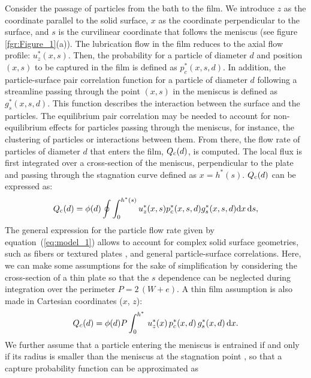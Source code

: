 \documentclass{jfm}
\begin{document}
Consider the passage of particles from the bath to the film. We introduce $z$ as the coordinate parallel to the solid surface, $x$ as the coordinate perpendicular to the surface, and $s$ is the curvilinear coordinate that follows the meniscus (see figure \ref{fgr:Figure_1}(a)). The lubrication flow in the film reduces to the axial flow profile: $u_{z}^{*}(x, s)$. Then, the probability for a particle of diameter $d$ and position $(x, s)$ to be captured in the film is defined as $p_{c}^{*}(x, s, d)$. In addition, the particle-surface pair correlation function for a particle of diameter $d$ following a streamline passing through the point $(x, s)$ in the meniscus is defined as $g_{s}^{*}(x, s, d)$. This function describes the interaction between the surface and the particles. The equilibrium pair correlation may be needed to account for non-equilibrium effects for particles passing through the meniscus, for instance, the clustering of particles or interactions between them. From there, the flow rate of particles of diameter $d$ that enters the film, $Q_{\rm c}(d)$, is computed. The local flux is first integrated over a cross-section of the meniscus, perpendicular to the plate and passing through the stagnation curve defined as $x = h^*(s)$. $Q_{\rm c}(d)$ can be expressed as:
% 
\begin{equation} \label{eq:model_1}
Q_{\rm c}(d)=\phi(d) \oint \int_{0}^{h^{*}(s)} u_{z}^{*}(x, s) p_{c}^{*}(x, s, d) g_{s}^{*}(x, s, d) {\rm d} x\, {\rm d} s,
\end{equation}
% 
The general expression for the particle flow rate given by equation~(\ref{eq:model_1}) allows to account for complex solid surface geometries, such as fibers or textured plates \cite[][]{dincau2020entrainment,seiwert2011coating}, and general particle-surface correlations. Here, we can make some assumptions for the sake of simplification by considering the cross-section of a thin plate so that the $s$ dependence can be neglected during integration over the perimeter $P=2\,(W+e)$. A thin film assumption is also made in Cartesian coordinates ($x$, $z$):
%
\begin{equation} \label{eq:model_2}
    Q_{c}(d) = \phi(d) P 
    \int_{0}^{h^{*}} \,u_{z}^{*}(x)\, p_{c}^{*}(x, d)\, g_{s}^{*}(x, d)\, {\rm d} x.
\end{equation}
%
We further assume that a particle entering the meniscus is entrained if and 
only if its radius is smaller than the meniscus at the stagnation point 
\cite[][]{sauret2019capillary}, so that a capture probability function can be approximated as
\end{document}
